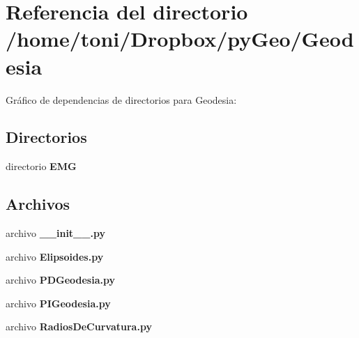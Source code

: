 \section{Referencia del directorio /home/toni/\-Dropbox/py\-Geo/\-Geodesia}
\label{dir_35649ec97b902c73f66d0b6bb21ebe5b}
Gráfico de dependencias de directorios para Geodesia\-:
\subsection*{Directorios}
\begin{DoxyCompactItemize}
\item 
directorio {\bf E\-M\-G}
\end{DoxyCompactItemize}
\subsection*{Archivos}
\begin{DoxyCompactItemize}
\item 
archivo {\bf \-\_\-\-\_\-init\-\_\-\-\_\-.\-py}
\item 
archivo {\bf Elipsoides.\-py}
\item 
archivo {\bf P\-D\-Geodesia.\-py}
\item 
archivo {\bf P\-I\-Geodesia.\-py}
\item 
archivo {\bf Radios\-De\-Curvatura.\-py}
\end{DoxyCompactItemize}
